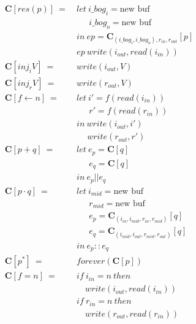 \documentclass[12pt, letterpaper]{article}
\begin{document}
{\begin{align*}
             \\
         \mathbf{C}[res(p)]\ 
             =\ &
             let\ i\_bog_i = \text{new buf}\\
             &\quad\ \ i\_bog_o = \text{new buf}\\
             &in\ ep = \mathbf{C}_{(i\_bog_i, i\_bog_o), r_{in}, r_{out}}[p]\\
             &ep\ write(i_{out}, read(i_{in}))
             \\
         \mathbf{C}[inj_iV]\ 
             =\ &
             write(i_{out}, V)
             \\
         \mathbf{C}[inj_rV]\ 
             =\ &
             write(r_{out}, V)
             \\
         \mathbf{C}[f \leftarrow n]\ 
             =\ &
             let\ i' = f(read(i_{in}))\\
             &\quad\ \ r' = f(read(r_{in}))\\
             &in\ write(i_{out}, i')\\
             &\quad \ write(r_{out}, r')
             \\
         \mathbf{C}[p + q]\ 
             =\ &
             let\ e_p = \mathbf{C}[q]\\
             &\quad\ \ e_q = \mathbf{C}[q]\\
             &in\ e_p||e_q
             \\
         \mathbf{C}[p \cdot q]\ 
             =\ &
             let\ i_{mid} = \text{new buf}\\
             &\quad\ \ r_{mid} = \text{new buf}\\
             &\quad\ \ e_p = \mathbf{C}_{(i_{in}, i_{mid}, r_{in}, r_{mid})}[q]\\
             &\quad\ \ e_q = \mathbf{C}_{(i_{mid}, i_{out}, r_{mid}, r_{out})}[q]\\
             &in\ e_p :: e_q
             \\
         \mathbf{C}[p ^{*}]\ 
             =\ &
             forever(\mathbf{C}[p])\\
         \mathbf{C}[f = n]\
            =\
            &if\ i_{in}=n\ then\\
            &\quad write(i_{out}, read(i_{in}))\\
            &if\ r_{in}=n\ then\\
            &\quad write(r_{out}, read(r_{in}))
     \end{align*}
 }
\end{document}
